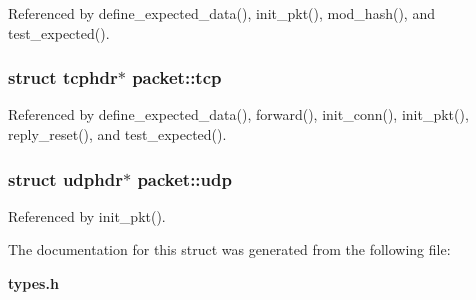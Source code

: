 Referenced by define\_\-expected\_\-data(), init\_\-pkt(), mod\_\-hash(), and test\_\-expected().
\subsubsection[{tcp}]{\setlength{\rightskip}{0pt plus 5cm}struct tcphdr$\ast$ {\bf packet::tcp}\hspace{0.3cm}{\tt  [read]}}\label{structpacket_af31dd9e6a81f1835d146ecb9d220841}




Referenced by define\_\-expected\_\-data(), forward(), init\_\-conn(), init\_\-pkt(), reply\_\-reset(), and test\_\-expected().
\subsubsection[{udp}]{\setlength{\rightskip}{0pt plus 5cm}struct udphdr$\ast$ {\bf packet::udp}\hspace{0.3cm}{\tt  [read]}}\label{structpacket_f32a568eb0cb5d65a63f87f16343980e}




Referenced by init\_\-pkt().

The documentation for this struct was generated from the following file:\begin{CompactItemize}
\item 
{\bf types.h}\end{CompactItemize}
